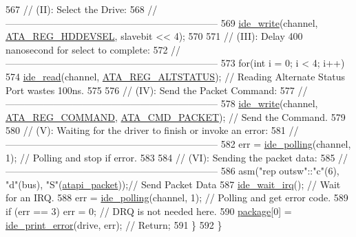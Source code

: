 \begin{DoxyCode}
567       \textcolor{comment}{// (II): Select the Drive:}
568       \textcolor{comment}{// ------------------------------------------------------------------}
569       \hyperlink{a00032_afdb22c37a32d86fcb64e55b3edab4790_afdb22c37a32d86fcb64e55b3edab4790}{ide\_write}(channel, \hyperlink{a00032_af80b9f0d852148eda227b433f72ca8bb_af80b9f0d852148eda227b433f72ca8bb}{ATA\_REG\_HDDEVSEL}, slavebit << 4);
570  
571       \textcolor{comment}{// (III): Delay 400 nanosecond for select to complete:}
572       \textcolor{comment}{// ------------------------------------------------------------------}
573       \textcolor{keywordflow}{for}(\textcolor{keywordtype}{int} i = 0; i < 4; i++)
574          \hyperlink{a00032_aef734da4bdc0c1d014528fd2f66e0686_aef734da4bdc0c1d014528fd2f66e0686}{ide\_read}(channel, \hyperlink{a00032_a051769d4520d201d24bbb06758a5c1de_a051769d4520d201d24bbb06758a5c1de}{ATA\_REG\_ALTSTATUS}); \textcolor{comment}{// Reading Alternate Status Port
       wastes 100ns.}
575  
576       \textcolor{comment}{// (IV): Send the Packet Command:}
577       \textcolor{comment}{// ------------------------------------------------------------------}
578       \hyperlink{a00032_afdb22c37a32d86fcb64e55b3edab4790_afdb22c37a32d86fcb64e55b3edab4790}{ide\_write}(channel, \hyperlink{a00032_a1a54069e05845badff84e1490ca4681e_a1a54069e05845badff84e1490ca4681e}{ATA\_REG\_COMMAND}, \hyperlink{a00032_afaaead63f9b69425b9f6514b03f0bbb2_afaaead63f9b69425b9f6514b03f0bbb2}{ATA\_CMD\_PACKET});      \textcolor{comment}{//
       Send the Command.}
579  
580       \textcolor{comment}{// (V): Waiting for the driver to finish or invoke an error:}
581       \textcolor{comment}{// ------------------------------------------------------------------}
582       err = \hyperlink{a00032_a03e85b94d6fbfb957e1b88c3dd064eca_a03e85b94d6fbfb957e1b88c3dd064eca}{ide\_polling}(channel, 1);            \textcolor{comment}{// Polling and stop if error.}
583  
584       \textcolor{comment}{// (VI): Sending the packet data:}
585       \textcolor{comment}{// ------------------------------------------------------------------}
586         \textcolor{keyword}{asm}(\textcolor{stringliteral}{"rep   outsw"}::\textcolor{stringliteral}{"c"}(6), \textcolor{stringliteral}{"d"}(bus), \textcolor{stringliteral}{"S"}(\hyperlink{a00032_a02351861ecf3191d5dbbcc1910b7c109_a02351861ecf3191d5dbbcc1910b7c109}{atapi\_packet}));\textcolor{comment}{// Send Packet Data}
587         \hyperlink{a00032_a31655fcec0cc8f9f8792b98cd4441fdf_a31655fcec0cc8f9f8792b98cd4441fdf}{ide\_wait\_irq}();                  \textcolor{comment}{// Wait for an IRQ.}
588         err = \hyperlink{a00032_a03e85b94d6fbfb957e1b88c3dd064eca_a03e85b94d6fbfb957e1b88c3dd064eca}{ide\_polling}(channel, 1);            \textcolor{comment}{// Polling and get error code.}
589         \textcolor{keywordflow}{if} (err == 3) err = 0; \textcolor{comment}{// DRQ is not needed here.}
590       \hyperlink{a00035_a820b2230ab700e13350794494bd4a60f_a820b2230ab700e13350794494bd4a60f}{package}[0] = \hyperlink{a00032_af7757307613c29c9bcbf0f8f5b2feee5_af7757307613c29c9bcbf0f8f5b2feee5}{ide\_print\_error}(drive, err); \textcolor{comment}{// Return;}
591    \}
592 \}
\end{DoxyCode}
